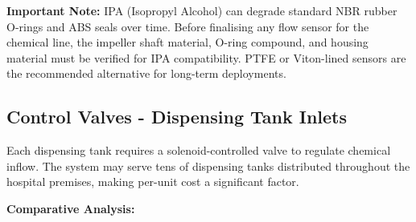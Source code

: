 \documentclass[12pt,a4paper]{article}
\begin{document}
\noindent\textbf{Important Note:} IPA (Isopropyl Alcohol) can degrade standard NBR rubber O-rings and ABS seals over time. Before finalising any flow sensor for the chemical line, the impeller shaft material, O-ring compound, and housing material must be verified for IPA compatibility. PTFE or Viton-lined sensors are the recommended alternative for long-term deployments.

\subsection{Control Valves - Dispensing Tank Inlets}

Each dispensing tank requires a solenoid-controlled valve to regulate chemical inflow. The system may serve tens of dispensing tanks distributed throughout the hospital premises, making per-unit cost a significant factor.

\vspace{0.3cm}
\noindent\textbf{Comparative Analysis:}
\end{document}
